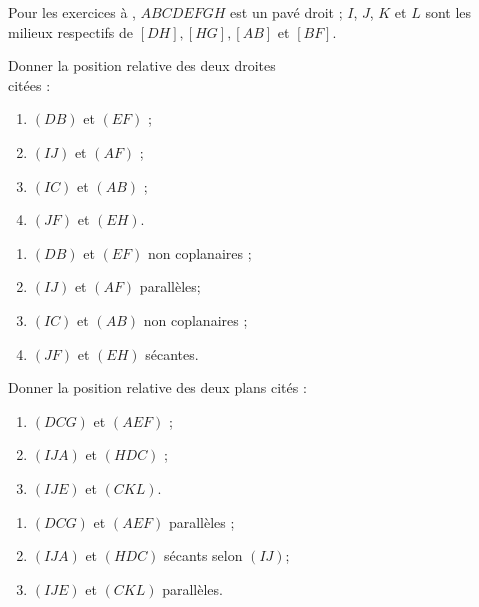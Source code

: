\begin{colonne*exercice}


Pour les exercices  à ,
$ABCDEFGH$ est un pavé droit ; $I$, $J$, $K$ et $L$ sont les milieux
respectifs de $[DH], [HG], [AB]$ et $[BF]$.

\begin{center}
  
\end{center}

\begin{exercice*}\label{G2Exo1}
Donner la position relative des deux droites\\ citées : 
\begin{enumerate}
\item $(DB)$ et $(EF)$ ;
\item $(IJ)$ et $(AF)$ ;
\item $(IC)$ et $(AB)$ ;
\item $(JF)$ et $(EH)$.
\end{enumerate}
\end{exercice*}
\begin{corrige}
  \begin{enumerate}
\item $(DB)$ et $(EF)$ non coplanaires ;
\item $(IJ)$ et $(AF)$ parallèles;
\item $(IC)$ et $(AB)$ non coplanaires ;
\item $(JF)$ et $(EH)$ sécantes.
\end{enumerate}
\end{corrige}

\begin{exercice*}
  Donner la position relative des deux plans cités :
  \begin{enumerate}
  \item $(DCG)$ et $(AEF)$ ;
  \item $(IJA)$ et $(HDC)$ ;
  \item $(IJE)$ et $(CKL)$.
  \end{enumerate}
\end{exercice*}
\begin{corrige}
  \begin{enumerate}
\item $(DCG)$ et $(AEF)$ parallèles ;
\item $(IJA)$ et $(HDC)$ sécants selon $(IJ)$;
\item $(IJE)$ et $(CKL)$ parallèles.
\end{enumerate}
\end{corrige}


\end{colonne*exercice}

